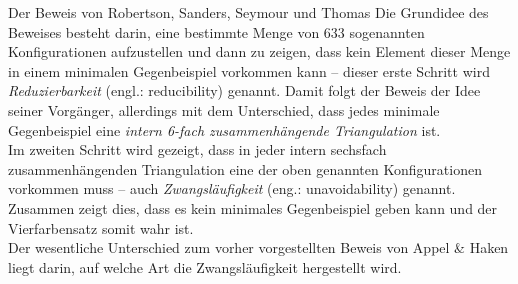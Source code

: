\begin{chapter}{Der Beweis von Robertson, Sanders, Seymour und Thomas}
  Die Grundidee des Beweises besteht darin, eine bestimmte Menge von 633 sogenannten Konfigurationen aufzustellen und dann zu zeigen, dass kein Element dieser Menge in einem minimalen Gegenbeispiel vorkommen kann -- dieser erste Schritt wird \textit{Reduzierbarkeit} (engl.: reducibility) genannt. Damit folgt der Beweis der Idee seiner Vorgänger, allerdings mit dem Unterschied, dass jedes minimale Gegenbeispiel eine \textit{intern 6-fach zusammenhängende Triangulation} ist. \\
  Im zweiten Schritt wird gezeigt, dass in jeder intern sechsfach zusammenhängenden Triangulation eine der oben genannten Konfigurationen vorkommen muss -- auch \textit{Zwangsläufigkeit} (eng.: unavoidability) genannt. Zusammen zeigt dies, dass es kein minimales Gegenbeispiel geben kann und der Vierfarbensatz somit wahr ist. \\
  Der wesentliche Unterschied zum vorher vorgestellten Beweis von Appel \& Haken liegt darin, auf welche Art die Zwangsläufigkeit hergestellt wird.
  
  
  
\end{chapter}
